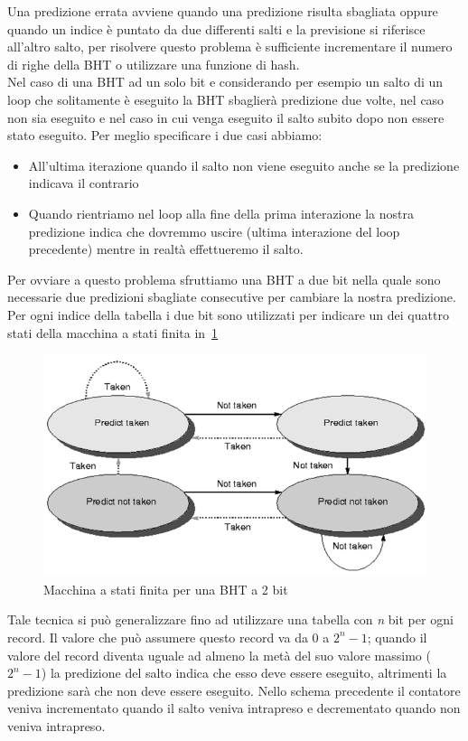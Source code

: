 Una predizione errata avviene quando una predizione risulta sbagliata oppure quando un indice è puntato da due differenti salti e la previsione si riferisce all'altro salto, per risolvere questo problema è sufficiente incrementare il numero di righe della BHT o utilizzare una funzione di hash.\\
Nel caso di una BHT ad un solo bit e considerando per esempio un salto di un loop che solitamente è eseguito la BHT sbaglierà predizione due volte, nel caso non sia eseguito e nel caso in cui venga eseguito il salto subito dopo non essere stato eseguito. Per meglio specificare i due casi abbiamo:
\begin{itemize}
\item All'ultima iterazione quando il salto non viene eseguito anche se la predizione indicava il contrario
\item Quando rientriamo nel loop alla fine della prima interazione la nostra predizione indica che dovremmo uscire (ultima interazione del loop precedente) mentre in realtà effettueremo il salto. 
\end{itemize}
Per ovviare a questo problema sfruttiamo una BHT a due bit nella quale sono necessarie due predizioni sbagliate consecutive per cambiare la nostra predizione. Per ogni indice della tabella i due bit sono utilizzati per indicare un dei quattro stati della macchina a stati finita in \figurename\,\ref{fig:bhtfsm}
\begin{figure}[htb]
\centering
\includegraphics[scale=0.4]{img/bhtfsm.png}
\caption{Macchina a stati finita per una BHT a 2 bit}\label{fig:bhtfsm}
\end{figure}
Tale tecnica si può generalizzare fino ad utilizzare una tabella con \emph{n} bit per ogni record. Il valore che può assumere questo record va da 0 a $2^n-1$; quando il valore del record diventa uguale ad almeno la metà del suo valore massimo ($2^n-1$) la predizione del salto indica che esso deve essere eseguito, altrimenti la predizione sarà che non deve essere eseguito. Nello schema precedente il contatore veniva incrementato quando il salto veniva intrapreso e decrementato quando non veniva intrapreso.
